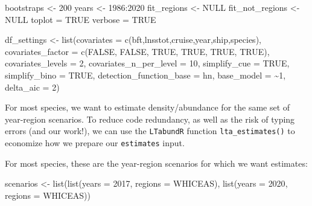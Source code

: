 \documentclass[
]{book}
\newenvironment{Shaded}{\begin{snugshade}}{\end{snugshade}}
\newcommand{\AttributeTok}[1]{\textcolor[rgb]{0.77,0.63,0.00}{#1}}
\newcommand{\ConstantTok}[1]{\textcolor[rgb]{0.00,0.00,0.00}{#1}}
\newcommand{\DecValTok}[1]{\textcolor[rgb]{0.00,0.00,0.81}{#1}}
\newcommand{\FunctionTok}[1]{\textcolor[rgb]{0.00,0.00,0.00}{#1}}
\newcommand{\NormalTok}[1]{#1}
\newcommand{\OtherTok}[1]{\textcolor[rgb]{0.56,0.35,0.01}{#1}}
\newcommand{\SpecialCharTok}[1]{\textcolor[rgb]{0.00,0.00,0.00}{#1}}
\newcommand{\StringTok}[1]{\textcolor[rgb]{0.31,0.60,0.02}{#1}}
\begin{document}
\begin{Shaded}
\begin{Highlighting}[]
\NormalTok{bootstraps }\OtherTok{\textless{}{-}} \DecValTok{200}
\NormalTok{years }\OtherTok{\textless{}{-}} \DecValTok{1986}\SpecialCharTok{:}\DecValTok{2020}
\NormalTok{fit\_regions }\OtherTok{\textless{}{-}} \ConstantTok{NULL}
\NormalTok{fit\_not\_regions }\OtherTok{\textless{}{-}} \ConstantTok{NULL}
\NormalTok{toplot }\OtherTok{=} \ConstantTok{TRUE}
\NormalTok{verbose }\OtherTok{=} \ConstantTok{TRUE}

\NormalTok{df\_settings }\OtherTok{\textless{}{-}}
  \FunctionTok{list}\NormalTok{(}\AttributeTok{covariates =} \FunctionTok{c}\NormalTok{(}\StringTok{\textquotesingle{}bft\textquotesingle{}}\NormalTok{,}\StringTok{\textquotesingle{}lnsstot\textquotesingle{}}\NormalTok{,}\StringTok{\textquotesingle{}cruise\textquotesingle{}}\NormalTok{,}\StringTok{\textquotesingle{}year\textquotesingle{}}\NormalTok{,}\StringTok{\textquotesingle{}ship\textquotesingle{}}\NormalTok{,}\StringTok{\textquotesingle{}species\textquotesingle{}}\NormalTok{),}
       \AttributeTok{covariates\_factor =} \FunctionTok{c}\NormalTok{(}\ConstantTok{FALSE}\NormalTok{, }\ConstantTok{FALSE}\NormalTok{, }\ConstantTok{TRUE}\NormalTok{, }\ConstantTok{TRUE}\NormalTok{, }\ConstantTok{TRUE}\NormalTok{, }\ConstantTok{TRUE}\NormalTok{),}
       \AttributeTok{covariates\_levels =} \DecValTok{2}\NormalTok{,}
       \AttributeTok{covariates\_n\_per\_level =} \DecValTok{10}\NormalTok{,}
       \AttributeTok{simplify\_cue =} \ConstantTok{TRUE}\NormalTok{,}
       \AttributeTok{simplify\_bino =} \ConstantTok{TRUE}\NormalTok{,}
       \AttributeTok{detection\_function\_base =} \StringTok{\textquotesingle{}hn\textquotesingle{}}\NormalTok{,}
       \AttributeTok{base\_model =} \StringTok{\textquotesingle{}\textasciitilde{}1\textquotesingle{}}\NormalTok{,}
       \AttributeTok{delta\_aic =} \DecValTok{2}\NormalTok{)}
\end{Highlighting}
\end{Shaded}

For most species, we want to estimate density/abundance for the same set of year-region scenarios. To reduce code redundancy, as well as the risk of typing errors (and our work!), we can use the \texttt{LTabundR} function \texttt{lta\_estimates()} to economize how we prepare our \texttt{estimates} input.

For most species, these are the year-region scenarios for which we want estimates:

\begin{Shaded}
\begin{Highlighting}[]
\NormalTok{scenarios }\OtherTok{\textless{}{-}} \FunctionTok{list}\NormalTok{(}\FunctionTok{list}\NormalTok{(}\AttributeTok{years =} \DecValTok{2017}\NormalTok{,}
                       \AttributeTok{regions =} \StringTok{\textquotesingle{}WHICEAS\textquotesingle{}}\NormalTok{),}
                  \FunctionTok{list}\NormalTok{(}\AttributeTok{years =} \DecValTok{2020}\NormalTok{, }
                       \AttributeTok{regions =} \StringTok{\textquotesingle{}WHICEAS\textquotesingle{}}\NormalTok{))}
\end{Highlighting}
\end{Shaded}
\end{document}

